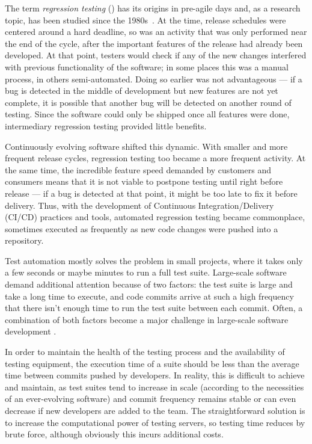 The term \textit{regression testing} (\rt) has its origins in pre-agile days and, as a research topic, has been studied since the 1980s~\cite{leung1989insights,yoo2012regression}.
At the time, release schedules were centered around a hard deadline, so \rt was an activity that was only performed near the end of the cycle, after the important features of the release had already been developed.
At that point, testers would check if any of the new changes interfered with previous functionality of the software; in some places this was a manual process, in others semi-automated.
Doing so earlier was not advantageous --- if a bug is detected in the middle of development but new features are not yet complete, it is possible that another bug will be detected on another round of testing.
Since the software could only be shipped once all features were done, intermediary regression testing provided little benefits.

Continuously evolving software shifted this dynamic.
With smaller and more frequent release cycles, regression testing too became a more frequent activity.
At the same time, the incredible feature speed demanded by customers and consumers means that it is not viable to postpone testing until right before release --- if a bug is detected at that point, it might be too late to fix it before delivery.
Thus, with the development of Continuous Integration/Delivery (CI/CD) practices and tools, automated regression testing became commonplace, sometimes executed as frequently as new code changes were pushed into a repository.

Test automation mostly solves the problem in small projects, where it takes only a few seconds or maybe minutes to run a full test suite.
Large-scale software demand additional attention because of two factors: the test suite is large and take a long time to execute, and code commits arrive at such a high frequency that there isn't enough time to run the test suite between each commit.
Often, a combination of both factors become a major challenge in large-scale software development \cite{memon_taming_2017}.

In order to maintain the health of the testing process and the availability of testing equipment, the execution time of a suite should be less than the average time between commits pushed by developers.
In reality, this is difficult to achieve and maintain, as test suites tend to increase in scale (according to the necessities of an ever-evolving software) and commit frequency remains stable or can even decrease if new developers are added to the team.
The straightforward solution is to increase the computational power of testing servers, so testing time reduces by brute force, although obviously this incurs additional costs.


